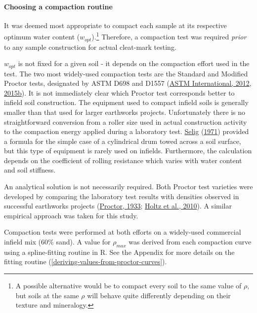 \documentclass[
  letterpaper,
  openany]{book}
\begin{document}
\hypertarget{choosing-a-compaction-routine}{%
\paragraph{Choosing a compaction routine}\label{choosing-a-compaction-routine}}

It was deemed most appropriate to compact each sample at its respective optimum water content (\(w_{opt}\)).\footnote{A possible alternative would be to compact every soil to the same value of \(\rho\), but soils at the same \(\rho\) will behave quite differently depending on their texture and mineralogy.} Therefore, a compaction test was required \emph{prior} to any sample construction for actual cleat-mark testing.

\(w_{opt}\) is not fixed for a given soil - it depends on the compaction effort used in the test.
The two most widely-used compaction tests are the Standard and Modified Proctor tests, designated by ASTM D698 and D1557 (\protect\hyperlink{ref-ASTMD698-12}{ASTM International, 2012}, \protect\hyperlink{ref-ASTMD15572015}{2015b}).
It is not immediately clear which Proctor test corresponds better to infield soil construction.
The equipment used to compact infield soils is generally smaller than that used for larger earthworks projects.
Unfortunately there is no straightforward conversion from a roller size used in actual construction activity to the compaction energy applied during a laboratory test.
\protect\hyperlink{ref-Selig1971}{Selig} (\protect\hyperlink{ref-Selig1971}{1971}) provided a formula for the simple case of a cylindrical drum towed across a soil surface, but this type of equipment is rarely used on infields. Furthermore, the calculation depends on the coefficient of rolling resistance which varies with water content and soil stiffness.

An analytical solution is not necessarily required. Both Proctor test varieties were developed by comparing the laboratory test results with densities observed in successful earthworks projects (\protect\hyperlink{ref-Proctor1933a}{Proctor, 1933}; \protect\hyperlink{ref-Holtz2010}{Holtz et al., 2010}).
A similar empirical approach was taken for this study.

Compaction tests were performed at both efforts on a widely-used commercial infield mix (60\% sand).
A value for \(\rho_{max}\) was derived from each compaction curve using a spline-fitting routine in R.
See the Appendix for more details on the fitting routine (\ref{deriving-values-from-proctor-curves}).
\end{document}
